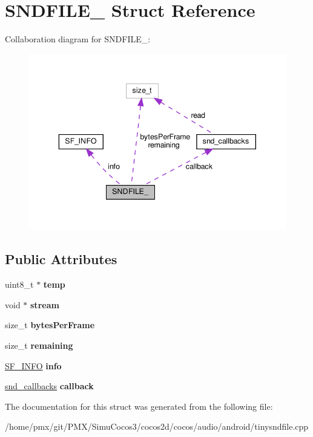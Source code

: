 \hypertarget{structSNDFILE__}{}\section{S\+N\+D\+F\+I\+L\+E\+\_\+ Struct Reference}
\label{structSNDFILE__}


Collaboration diagram for S\+N\+D\+F\+I\+L\+E\+\_\+\+:
\nopagebreak
\begin{figure}[H]
\begin{center}
\leavevmode
\includegraphics[width=343pt]{structSNDFILE____coll__graph}
\end{center}
\end{figure}
\subsection*{Public Attributes}
\begin{DoxyCompactItemize}
\item 
\mbox{\label{structSNDFILE___af9c9451e93e8f62aaccfb502a1fdf2f8}} 
uint8\+\_\+t $\ast$ {\bfseries temp}
\item 
\mbox{\label{structSNDFILE___a4e0bb491590f298a9a40841737d18b75}} 
void $\ast$ {\bfseries stream}
\item 
\mbox{\label{structSNDFILE___a6cca3db6d995a02c16671f5a16829766}} 
size\+\_\+t {\bfseries bytes\+Per\+Frame}
\item 
\mbox{\label{structSNDFILE___aff5bb56c282db0da9ec2e8b72c81afb8}} 
size\+\_\+t {\bfseries remaining}
\item 
\mbox{\label{structSNDFILE___a09fa866c7659fc4c9b26942152d8fa0e}} 
\hyperlink{structSF__INFO}{S\+F\+\_\+\+I\+N\+FO} {\bfseries info}
\item 
\mbox{\label{structSNDFILE___a157ba8f6d9ff64eb3594cb7148255df7}} 
\hyperlink{structsnd__callbacks}{snd\+\_\+callbacks} {\bfseries callback}
\end{DoxyCompactItemize}


The documentation for this struct was generated from the following file\+:\begin{DoxyCompactItemize}
\item 
/home/pmx/git/\+P\+M\+X/\+Simu\+Cocos3/cocos2d/cocos/audio/android/tinysndfile.\+cpp\end{DoxyCompactItemize}
